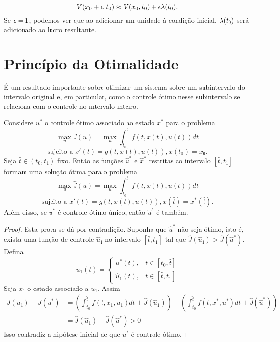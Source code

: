 \begin{equation*}
    V(x_0 + \epsilon,t_0) \approx V(x_0,t_0) + \epsilon\lambda(t_0). 
\end{equation*}
Se $\epsilon = 1$, podemos ver que ao adicionar um unidade à condição inicial,
$\lambda(t_0)$ será adicionado ao lucro resultante. 

\section{Princípio da Otimalidade}

É um resultado importante sobre otimizar um sistema sobre um subintervalo do
intervalo original e, em particular, como o controle ótimo nesse subintervalo
se relaciona com o controle no intervalo inteiro. 

\begin{theorem}
    Considere $u^*$ o controle ótimo associado ao estado $x^*$ para o problema
    $$
    \max_u J(u) = \max_u \int_{t_0}^{t_1} f(t, x(t), u(t)) dt 
    $$
    $$
    \text{sujeito a  }x'(t) = g(t, x(t), u(t)), x(t_0) = x_0.
    $$
    Seja $\hat{t} \in (t_0, t_1)$ fixo. Então as
    funções $\hat{u}^*$ e $\hat{x}^*$ restritas ao intervalo $[\hat{t},t_1]$ 
    formam uma solução ótima para o problema 
    $$
    \max_u \hat{J}(u) = \max_u \int_{t_0}^{t_1} f(t, x(t), u(t)) dt 
    $$
    $$
    \text{sujeito a  }x'(t) = g(t, x(t), u(t)), x(\hat{t}) = x^*(\hat{t}).
    $$
    Além disso, se $u^*$ é controle ótimo único, então
    $\hat{u}^*$ é também. 
\end{theorem}

\begin{proof}
    Esta prova se dá por contradição. Suponha que $\hat{u}^*$ não seja ótimo,
    isto é, exista uma função de controle $\hat{u}_1$ no intervalo $[\hat{t},
    t_1]$ tal que $\hat{J}(\hat{u}_1) > \hat{J}(\hat{u}^*)$. Defina 
    $$u_1(t) = 
    \begin{cases}
        u^*(t), &t \in [t_0, \hat{t}] \\
        \hat{u}_1(t), &t \in [\hat{t}, t_1]
    \end{cases}
    $$
    Seja $x_1$ o estado associado a $u_1$. Assim 
    \begin{equation*}
        \begin{split}
            J(u_1) - J(u^*) &= \left(\int_{t_0}^{\hat{t}} f(t,x_1,u_1)dt +
            \hat{J}(\hat{u}_1)\right) - \left(\int_{t_0}^{\hat{t}} f(t,x^*,u^*)dt +
            \hat{J}(\hat{u}^*)\right) \\
            &= \hat{J}(\hat{u}_1) - \hat{J}(\hat{u}^*) > 0 
        \end{split}        
    \end{equation*}
    Isso contradiz a hipótese inicial de que $u^*$ é controle ótimo. 
\end{proof}

